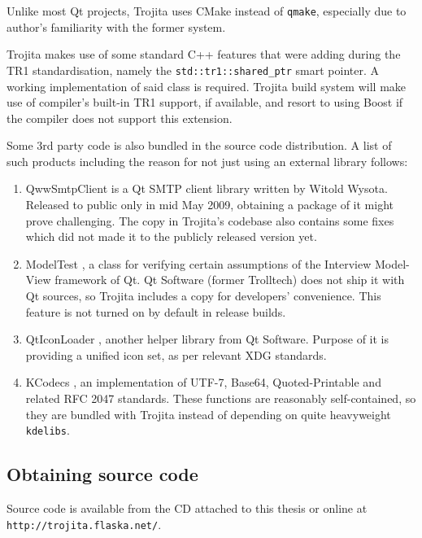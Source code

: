 \documentclass[12pt,notitlepage]{report}
\newcommand{\trojita}{Trojita\xspace}
\begin{document}
Unlike most Qt projects, \trojita uses CMake \cite{cmake} instead of {\tt qmake},
especially due to author's familiarity with the former system.

\trojita makes use of some standard C++ features that were adding during the TR1
\cite{std-tr1} standardisation, namely the {\tt std::tr1::shared\_ptr} smart
pointer. A working implementation of said class is required.  \trojita build
system will make use of compiler's built-in TR1 support, if available, and
resort to using Boost if the compiler does not support this extension.

Some 3rd party code is also bundled in the source code distribution.  A list of
such products including the reason for not just using an external library
follows:

\begin{enumerate}
    \item{QwwSmtpClient \cite{qwwsmtpclient} is a Qt SMTP client library written
        by Witold Wysota.  Released to public only in mid May 2009, obtaining a
        package of it might prove challenging.  The copy in \trojita's codebase
        also contains some fixes which did not made it to the publicly released
        version yet.}
    \item{ModelTest \cite{modeltest}, a class for verifying certain assumptions
        of the Interview Model-View framework of Qt.  Qt Software (former
        Trolltech) does not ship it with Qt sources, so \trojita includes a copy
        for developers' convenience.  This feature is not turned on by default
        in release builds.}
    \item{QtIconLoader \cite{qticonloader}, another helper library from Qt
        Software.  Purpose of it is providing a unified icon set, as per
        relevant XDG standards.}
    \item{KCodecs \cite{kcodecs}, an implementation of UTF-7, Base64,
        Quoted-Printable and related RFC 2047 standards.  These functions are
        reasonably self-contained, so they are bundled with \trojita instead of
        depending on quite heavyweight {\tt kdelibs}.}
\end{enumerate}

\subsection{Obtaining source code}

Source code is available from the CD attached to this thesis or online at {\tt
http://trojita.flaska.net/}.
\end{document}
